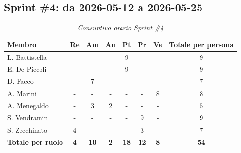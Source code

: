 \documentclass[a4paper, 10pt, colorlinks=true, linkcolor=black, urlcolor=blue, citecolor=blue, hidelinks]{article}
\renewcommand{\arraystretch}{1.2}
\begin{document}
\subsection{Sprint \#4: da 2026-05-12 a 2026-05-25}

\begin{table}[H]
    \centering
    \renewcommand{\arraystretch}{1.4}
    \begin{tabular}{|l|c|c|c|c|c|c|c|}
        \hline
        \rowcolor{bluBitless!15}
        \textbf{Membro} & \textbf{Re} & \textbf{Am} & \textbf{An} & \textbf{Pt} & \textbf{Pr} & \textbf{Ve} & \textbf{Totale per persona} \\
        \hline
        L. Battistella & - & - & - & 9 & - & - & 9 \\ \hline
        E. De Piccoli & - & - & - & 9 & - & - & 9 \\ \hline
        D. Facco & - & 7 & - & - & - & - & 7 \\ \hline
        A. Marini & - & - & - & - & - & 8 & 8 \\ \hline
        A. Menegaldo & - & 3 & 2 & - & - & - & 5 \\ \hline
        S. Vendramin & - & - & - & - & 9 & - & 9 \\ \hline
        S. Zecchinato & 4 & - & - & - & 3 & - & 7 \\ \hline
        \rowcolor{bluBitless!8}
        \textbf{Totale per ruolo} & \textbf{4} & \textbf{10} & \textbf{2} & \textbf{18} & \textbf{12} & \textbf{8} & \textbf{54} \\
        \hline
    \end{tabular}
    \caption{\textit{Consuntivo orario Sprint \#4}}
\end{table}
\end{document}

